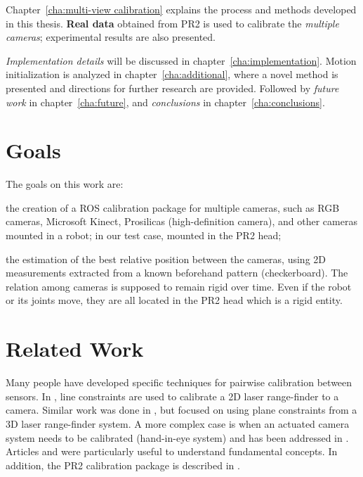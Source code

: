 Chapter~\ref{cha:multi-view calibration} explains the process and methods developed in this thesis. \textbf{Real data} obtained from PR2 is used to calibrate the \textit{multiple cameras}; experimental results are also presented.

\textit{Implementation details} will be discussed in chapter~\ref{cha:implementation}. Motion initialization is analyzed in chapter~\ref{cha:additional}, where a novel method is presented and directions for further research are provided. Followed by \textit{future work} in chapter~\ref{cha:future}, and \textit{conclusions} in chapter~\ref{cha:conclusions}.




\section{Goals}

The goals on this work are:
\begin{itemize*}
  \item the creation of a ROS calibration package for multiple cameras, such as RGB cameras, Microsoft Kinect, Prosilicas (high-definition camera), and other cameras mounted in a robot; in our test case, mounted in the PR2 head;

 \item the estimation of the best relative position between the cameras, using 2D measurements extracted from a known beforehand pattern (checkerboard). The relation among cameras is supposed to remain rigid over time. Even if the robot or its joints move, they are all located in the PR2 head which is a rigid entity.
\end{itemize*}




\section{Related Work}

Many people have developed specific techniques for pairwise calibration between
sensors. In \cite{Zhang04extrinsiccalibration}, line constraints are used to calibrate a 2D laser range-finder to a camera. Similar work was done in \cite{Unnikrishnan_fastextrinsic}, but focused on using plane constraints from a 3D laser range-finder system. A more complex case is when an actuated camera system needs to be calibrated (hand-in-eye system) and has been addressed in \cite{Horaud_hand-eyecalibration}. Articles \cite{Dynamic_camera_calibration} and \cite{4587681} were particularly useful to understand fundamental concepts. In addition, the PR2 calibration package is described in \cite{pr2_calibration_paper}.


